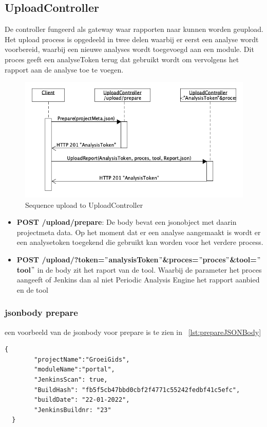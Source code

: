 \subsection{UploadController}\label{subsec:uploadcontroller}
De controller fungeerd als gateway waar rapporten naar kunnen worden geupload. Het upload process is opgedeeld in twee delen waarbij er eerst een analyse wordt voorbereid, waarbij een nieuwe analyses wordt toegevoegd aan een module. Dit proces geeft een analyseToken terug dat gebruikt wordt om vervolgens het rapport aan de analyse toe te voegen.
\begin{figure}[bth]
    \myfloatalign
    \includegraphics[width=12cm]{gfx/umlet/exports/SeqAddReport}
    \caption{Sequence upload to UploadController}
    \label{fig:SequenceClientUploadReport}
\end{figure}

\begin{itemize}
    \item \textbf{POST /upload/prepare}: De body bevat een jsonobject met daarin projectmeta data. Op het moment dat er een analyse aangemaakt is wordt er een analysetoken toegekend die gebruikt kan worden voor het verdere process.
    \item \textbf{POST /upload/?token=$"$analysisToken$"$\&proces=$"$proces$"$\&tool=$"$tool$"$} in de body zit het raport van de tool. Waarbij de parameter het proces aangeeft of Jenkins dan al niet Periodic Analysis Engine het rapport aanbied en de tool
\end{itemize}

\subsubsection{jsonbody prepare}
een voorbeeld van de jsonbody voor prepare is te zien in ~\ref{lst:prepareJSONBody}
\begin{lstlisting}[caption={Datamodel vanuit Jenkins},label=lst:prepareJSONBody]
    {
        "projectName":"GroeiGids",
        "moduleName":"portal",
        "JenkinsScan": true,
        "BuildHash": "fb5f5cb47bbd0cbf2f4771c55242fedbf41c5efc",
        "buildDate": "22-01-2022",
        "JenkinsBuildnr: "23"
  }
\end{lstlisting}


